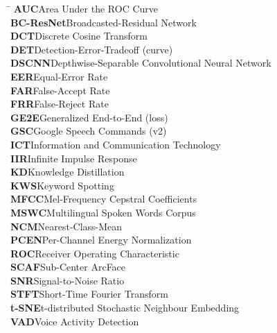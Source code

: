 \documentclass[12pt,a4paper]{article}
\begin{document}
\begin{tabbing}
\hspace{2.6cm}\=\kill
\textbf{AUC}\>Area Under the ROC Curve \\
\textbf{BC-ResNet}\>Broadcasted-Residual Network \\
\textbf{DCT}\>Discrete Cosine Transform \\
\textbf{DET}\>Detection-Error-Tradeoff (curve) \\
\textbf{DSCNN}\>Depthwise-Separable Convolutional Neural Network \\
\textbf{EER}\>Equal-Error Rate \\
\textbf{FAR}\>False-Accept Rate \\
\textbf{FRR}\>False-Reject Rate \\
\textbf{GE2E}\>Generalized End-to-End (loss) \\
\textbf{GSC}\>Google Speech Commands (v2) \\
\textbf{ICT}\>Information and Communication Technology \\
\textbf{IIR}\>Infinite Impulse Response \\
\textbf{KD}\>Knowledge Distillation \\
\textbf{KWS}\>Keyword Spotting \\
\textbf{MFCC}\>Mel-Frequency Cepstral Coefficients \\
\textbf{MSWC}\>Multilingual Spoken Words Corpus \\
\textbf{NCM}\>Nearest-Class-Mean \\
\textbf{PCEN}\>Per-Channel Energy Normalization \\
\textbf{ROC}\>Receiver Operating Characteristic \\
\textbf{SCAF}\>Sub-Center ArcFace \\
\textbf{SNR}\>Signal-to-Noise Ratio \\
\textbf{STFT}\>Short-Time Fourier Transform \\
\textbf{t-SNE}\>t-distributed Stochastic Neighbour Embedding \\
\textbf{VAD}\>Voice Activity Detection \\
\end{tabbing}

\newpage
\listoftables
{}
\listoffigures
{}

\newpage
\end{document}
